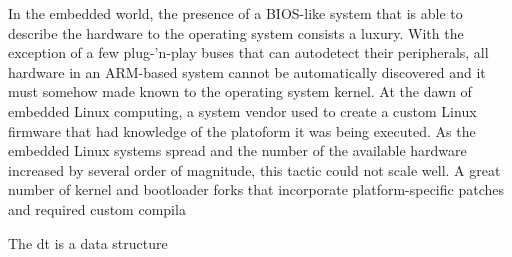In the embedded world, the presence of a BIOS-like system that is able 
to describe the hardware to the operating system consists a luxury.
With the exception of a few plug-'n-play buses that can autodetect their peripherals,
all hardware in an ARM-based system cannot be automatically discovered and it must somehow
made known to the operating system kernel. At the dawn of embedded Linux computing,
a system vendor used to create a custom Linux firmware that had knowledge of the platoform
it was being executed. As the embedded Linux systems spread and the number of the available
hardware increased by several order of magnitude, this tactic could not scale well.
A great number of kernel and bootloader forks that incorporate platform-specific patches
and required custom compila

The \gls{dt} is a data structure 




